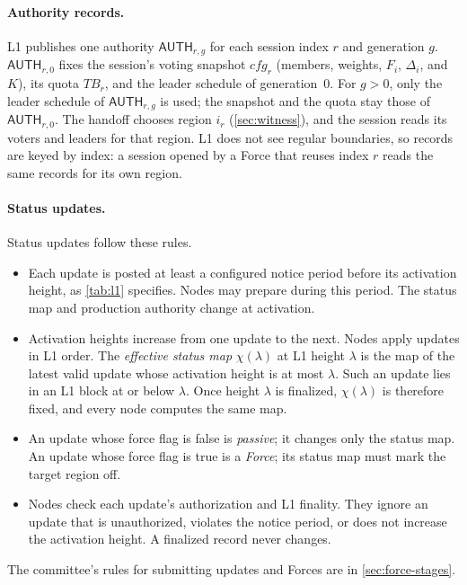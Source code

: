 \documentclass[11pt,a4paper]{article}
\newcommand{\TB}{\mathit{TB}}
\newcommand{\tagg}[1]{\ensuremath{\mathsf{#1}}}
\newcommand{\defterm}[1]{\textcolor{rrBlue}{\textit{#1}}}
\begin{document}
\paragraph{Authority records.}
L1 publishes one authority $\tagg{AUTH}_{r,g}$ for each
session index $r$ and generation $g$. $\tagg{AUTH}_{r,0}$ fixes the
session's voting snapshot $\mathit{cfg}_r$ (members, weights, $F_i$,
$\Delta_i$, and $K$), its quota $\TB_r$, and the leader schedule of
generation~$0$. For $g>0$, only the leader schedule of $\tagg{AUTH}_{r,g}$ is
used; the snapshot and the quota stay those of $\tagg{AUTH}_{r,0}$. The handoff chooses region $i_r$
(\cref{sec:witness}), and the session reads its voters and leaders for
that region. L1 does not see regular boundaries, so records are keyed by
index: a session opened by a Force that reuses index $r$ reads the same
records for its own region.

\paragraph{Status updates.}
Status updates follow these rules.
\begin{itemize}
\item Each update is posted at least a configured notice period before
its activation height, as \cref{tab:l1} specifies. Nodes may prepare during this period. The status map and production authority change at activation.
\item Activation heights increase from one update to the next. Nodes
apply updates in L1 order. The \defterm{effective status map}
$\chi(\lambda)$ at L1 height $\lambda$ is the map of the latest valid
update whose activation height is at most $\lambda$. Such an
update lies in an L1 block at or below $\lambda$. Once height $\lambda$ is
finalized, $\chi(\lambda)$ is therefore fixed, and every node computes
the same map.
\item An update whose force flag is false is \defterm{passive};
it changes only the status map. An update whose force flag is true is a
\defterm{Force}; its status map must mark the target region off.
\item Nodes check each update's authorization and L1 finality.
They ignore an update that is unauthorized, violates the
notice period, or does not increase the activation height. A
finalized record never changes.
\end{itemize}
The committee's rules for submitting updates and Forces are
in \cref{sec:force-stages}.
\end{document}
